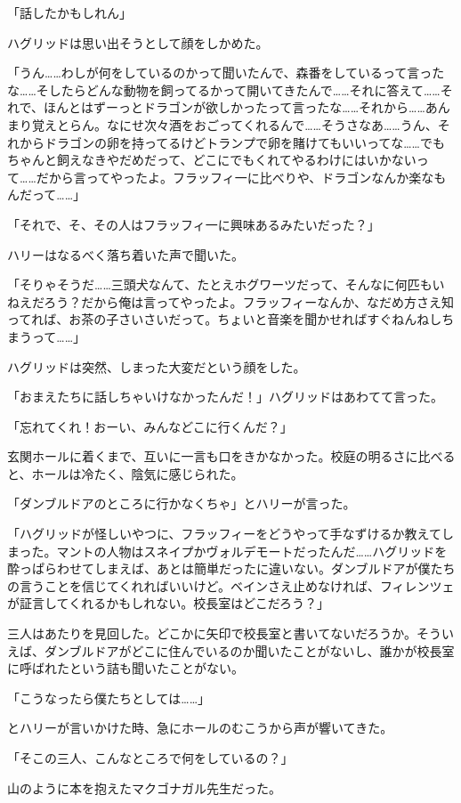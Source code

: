 \documentclass[10pt,a4paper]{article}
\begin{document}
\begin{CJK}{UTF8}{min}
「話したかもしれん」

ハグリッドは思い出そうとして顔をしかめた。

「うん……わしが何をしているのかって聞いたんで、森番をしているって言ったな……そしたらどんな動物を飼ってるかって開いてきたんで……それに答えて……それで、ほんとはずーっとドラゴンが欲しかったって言ったな……それから……あんまり覚えとらん。なにせ次々酒をおごってくれるんで……そうさなあ……うん、それからドラゴンの卵を持ってるけどトランプで卵を賭けてもいいってな……でもちゃんと飼えなきやだめだって、どこにでもくれてやるわけにはいかないって……だから言ってやったよ。フラッフィ一に比べりや、ドラゴンなんか楽なもんだって……」

「それで、そ、その人はフラッフィ一に興味あるみたいだった？」

ハリーはなるべく落ち着いた声で聞いた。

「そりゃそうだ……三頭犬なんて、たとえホグワーツだって、そんなに何匹もいねえだろう？だから俺は言ってやったよ。フラッフィーなんか、なだめ方さえ知ってれば、お茶の子さいさいだって。ちょいと音楽を聞かせればすぐねんねしちまうって……」

ハグリッドは突然、しまった大変だという顔をした。

「おまえたちに話しちゃいけなかったんだ！」ハグリッドはあわてて言った。

「忘れてくれ！おーい、みんなどこに行くんだ？」

玄関ホールに着くまで、互いに一言も口をきかなかった。校庭の明るさに比べると、ホールは冷たく、陰気に感じられた。

「ダンブルドアのところに行かなくちゃ」とハリーが言った。

「ハグリッドが怪しいやつに、フラッフィーをどうやって手なずけるか教えてしまった。マントの人物はスネイプかヴォルデモートだったんだ……ハグリッドを酔っぱらわせてしまえば、あとは簡単だったに違いない。ダンブルドアが僕たちの言うことを信じてくれればいいけど。ベインさえ止めなければ、フィレンツェが証言してくれるかもしれない。校長室はどこだろう？」

三人はあたりを見回した。どこかに矢印で校長室と書いてないだろうか。そういえば、ダンブルドアがどこに住んでいるのか聞いたことがないし、誰かが校長室に呼ばれたという詰も聞いたことがない。

「こうなったら僕たちとしては……」

とハリーが言いかけた時、急にホールのむこうから声が響いてきた。

「そこの三人、こんなところで何をしているの？」

山のように本を抱えたマクゴナガル先生だった。


\end{CJK}
\end{document}
